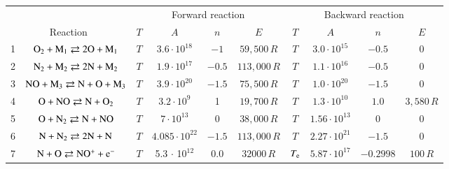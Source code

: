 \documentclass{warpdoc}
\renewcommand{\fontsizetable}{\footnotesize\scalefont{0.9}}
\begin{document}
%
\begin{table}[t]
\fontsizetable
\begin{center}
\begin{threeparttable}
\begin{tabular}{cccccccccc} 
\toprule
~&~&\multicolumn{4}{c}{Forward reaction} & \multicolumn{4}{c}{Backward reaction} \\
 \cmidrule(lr){3-6}\cmidrule(lr){7-10}
\multicolumn{2}{c}{Reaction} & $T$ & $A$ & $n$ & $E$ & $T$  & $A$ & $n$ & $E$ \\ 
\midrule
1 & $\rm O_2 + M_1 \rightleftarrows 2O+M_1$ &$T$ & $3.6 \cdot 10^{18}$  & $-1$    & $59,500 \, R$  
                                          &$T$  & $3.0 \cdot 10^{15}$  & $-0.5$  & 0\\
2 & $\rm N_2 + M_2 \rightleftarrows 2N+M_2$ &$T$  & $1.9 \cdot 10^{17}$ & $-0.5$ & $113,000 \, R$ 
                                          &$T$  & $1.1 \cdot 10^{16}$  & $-0.5$  & 0\\
3 & $\rm NO + M_3 \rightleftarrows N+O+M_3$ &$T$  & $3.9 \cdot 10^{20}$ & $-1.5$ & $75,500\, R$ 
                                          &$T$ & $1.0 \cdot 10^{20}$  & $-1.5$  & 0\\
4 & $\rm O + NO \rightleftarrows N+O_2$ &$T$ & $3.2 \cdot 10^{9}$ & 1 & $19,700 \, R$ 
                                          &$T$ & $1.3 \cdot 10^{10}$  & $1.0$  & $3,580 \, R$\\
5 & $\rm O + N_2 \rightleftarrows N+NO$ &$T$ & $7 \cdot 10^{13}$ & 0 & $38,000\, R$ 
                                          &$T$ & $1.56 \cdot 10^{13}$  & $0$  & 0\\
6 & $\rm N + N_2 \rightleftarrows 2N+N$ &$T$ & $4.085 \cdot 10^{22}$ & $-1.5$ & $113,000\, R$ 
                                          &$T$ & $2.27 \cdot 10^{21}$  & $-1.5$  & 0\\
                                          
7 & $\rm N + O \rightleftarrows NO^+ + e^- $ & $T$  & 5.3 $\cdot$ 10$^{12}$  & 0.0 & $32000 \, R$ & $T_{\rm e}$ & $5.87 \cdot 10^{17}$ & $-0.2998$ & $100 \, R$ \\

                                          
                                          

\end{tabular}
\end{threeparttable}
\end{center}
\end{table}
\end{document}
